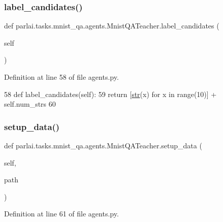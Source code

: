 \subsubsection{\texorpdfstring{label\+\_\+candidates()}{label\_candidates()}}
{\footnotesize\ttfamily def parlai.\+tasks.\+mnist\+\_\+qa.\+agents.\+Mnist\+Q\+A\+Teacher.\+label\+\_\+candidates (\begin{DoxyParamCaption}\item[{}]{self }\end{DoxyParamCaption})}



Definition at line 58 of file agents.\+py.


\begin{DoxyCode}
58     \textcolor{keyword}{def }label\_candidates(self):
59         \textcolor{keywordflow}{return} [\hyperlink{namespacegenerate__task__READMEs_a5b88452ffb87b78c8c85ececebafc09f}{str}(x) \textcolor{keywordflow}{for} x \textcolor{keywordflow}{in} range(10)] + self.num\_strs
60 
\end{DoxyCode}
\mbox{\label{classparlai_1_1tasks_1_1mnist__qa_1_1agents_1_1MnistQATeacher_ae7f02d6dd1340c5120431d0df6440352}} 
\subsubsection{\texorpdfstring{setup\+\_\+data()}{setup\_data()}}
{\footnotesize\ttfamily def parlai.\+tasks.\+mnist\+\_\+qa.\+agents.\+Mnist\+Q\+A\+Teacher.\+setup\+\_\+data (\begin{DoxyParamCaption}\item[{}]{self,  }\item[{}]{path }\end{DoxyParamCaption})}



Definition at line 61 of file agents.\+py.


